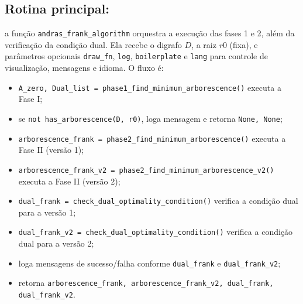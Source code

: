 \subsection{Rotina principal:}
a função \texttt{andras\_frank\_algorithm} orquestra a execução das fases 1 e 2, além da verificação da condição dual. Ela recebe o digrafo \(D\), a raiz \(r0\) (fixa), e parâmetros opcionais \texttt{draw\_fn}, \texttt{log}, \texttt{boilerplate} e \texttt{lang} para controle de visualização, mensagens e idioma. O fluxo é:

\begin{itemize}\setlength{\itemsep}{1pt}
	\item \texttt{A\_zero, Dual\_list = phase1\_find\_minimum\_arborescence()} executa a Fase I;
	\item se \texttt{not has\_arborescence(D, r0)}, loga mensagem e retorna \texttt{None, None};
	\item \texttt{arborescence\_frank = phase2\_find\_minimum\_arborescence()} executa a Fase II (versão 1);
	\item \texttt{arborescence\_frank\_v2 = phase2\_find\_minimum\_arborescence\_v2()} executa a Fase II (versão 2);
	\item \texttt{dual\_frank = check\_dual\_optimality\_condition()} verifica a condição dual para a versão 1;
	\item \texttt{dual\_frank\_v2 = check\_dual\_optimality\_condition()} verifica a condição dual para a versão 2;
	\item loga mensagens de sucesso/falha conforme \texttt{dual\_frank} e \texttt{dual\_frank\_v2};
	\item retorna \texttt{arborescence\_frank, arborescence\_frank\_v2, dual\_frank, dual\_frank\_v2}.
\end{itemize}

